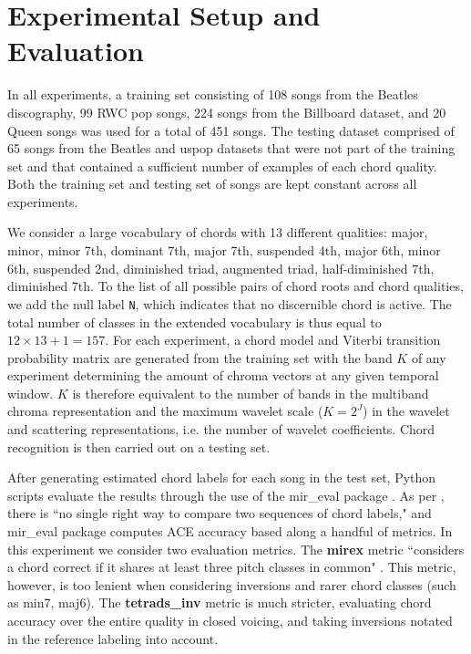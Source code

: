 \documentclass{article}
\makeatletter
\newcommand*{\ie}{i.e.\@\xspace}
\makeatother
\begin{document}
\section{Experimental Setup and Evaluation}\label{sec:experiment}

In all experiments, a training set consisting of 108 songs from the Beatles
discography, 99 RWC pop songs, 224 songs from the Billboard dataset, and 20 Queen songs was used for a total of 451 songs.
The testing dataset comprised of 65 songs from the Beatles and uspop datasets that were not part
of the training set and that contained a sufficient number of examples of each chord quality. 
Both the training set and testing set of songs are kept constant across all experiments.
	
We consider a large vocabulary of chords with 13 different qualities:
major, minor, minor 7th, dominant 7th, major 7th, suspended 4th, major 6th, minor 6th, suspended 2nd, diminished triad, augmented triad, half-diminished 7th, diminished 7th.
To the list of all possible pairs of chord roots and chord qualities,
we add the null label \texttt{N}, which indicates that no discernible chord is active.
The total number of classes in the extended vocabulary is thus equal to
$12 \times 13 + 1 = 157$.
For each experiment, a chord model and Viterbi transition probability matrix are generated from the  training set with the band $K$ of any experiment determining the amount of chroma vectors at any given temporal window.
$K$ is therefore equivalent to the number of bands in the multiband chroma representation and the maximum wavelet scale ($K = 2^J$) in the wavelet and scattering representations, \ie the number of wavelet coefficients.
Chord recognition is then carried out on a testing set.

After generating estimated chord labels for each song in the test set, Python scripts evaluate the results through the use of the mir\_eval package \cite{raffel2014mir}.
As per \cite{raffel2014mir}, there is ``no single right way to compare two sequences of chord labels,"
and mir\_eval package computes ACE accuracy based along a handful of metrics.
In this experiment we consider two evaluation metrics. The \textbf{mirex} metric ``considers a chord
correct if it shares at least three pitch classes in common" \cite{raffel2014mir}. This metric, however, is too lenient when considering inversions and rarer chord classes (such as min7, maj6). The \textbf{tetrads\_inv} metric is much stricter, evaluating chord accuracy over the entire quality in closed voicing, and taking inversions notated in the reference labeling into account.
	
\end{document}
